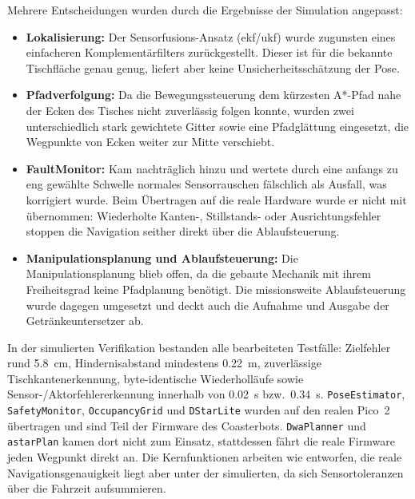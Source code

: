 Mehrere Entscheidungen wurden durch die Ergebnisse der Simulation angepasst:
\begin{itemize}[itemsep=2pt,topsep=3pt,parsep=0pt]
    \item \textbf{Lokalisierung:} Der Sensorfusions-Ansatz (\acrshort{ekf}/\acrshort{ukf}) wurde zugunsten eines einfacheren Komplementärfilters zurückgestellt. Dieser ist für die bekannte Tischfläche genau genug, liefert aber keine Unsicherheitsschätzung der Pose.
    \item \textbf{Pfadverfolgung:} Da die Bewegungssteuerung dem kürzesten A*-Pfad nahe der Ecken des Tisches nicht zuverlässig folgen konnte, wurden zwei unterschiedlich stark gewichtete Gitter sowie eine Pfadglättung eingesetzt, die Wegpunkte von Ecken weiter zur Mitte verschiebt.
    \item \textbf{FaultMonitor:} Kam nachträglich hinzu und wertete durch eine anfangs zu eng gewählte Schwelle normales Sensorrauschen fälschlich als Ausfall, was korrigiert wurde. Beim Übertragen auf die reale Hardware wurde er nicht mit übernommen: Wiederholte Kanten-, Stillstands- oder Ausrichtungsfehler stoppen die Navigation seither direkt über die Ablaufsteuerung.
    \item \textbf{Manipulationsplanung und Ablaufsteuerung:} Die Manipulationsplanung blieb offen, da die gebaute Mechanik mit ihrem Freiheitsgrad keine Pfadplanung benötigt. Die missionsweite Ablaufsteuerung wurde dagegen umgesetzt und deckt auch die Aufnahme und Ausgabe der Getränkeuntersetzer ab.
\end{itemize}

In der simulierten Verifikation bestanden alle bearbeiteten Testfälle: Zielfehler rund \SI{5,8}{\centi\meter}, Hindernisabstand mindestens \SI{0,22}{\meter}, zuverlässige Tischkantenerkennung, byte-identische Wiederholläufe sowie Sensor-/Aktorfehlererkennung innerhalb von \SI{0,02}{\second} bzw.\ \SI{0,34}{\second}. \texttt{PoseEstimator}, \texttt{SafetyMonitor}, \texttt{OccupancyGrid} und \texttt{DStarLite} wurden auf den realen Pico~2 übertragen und sind Teil der Firmware des Coasterbots. \texttt{DwaPlanner} und \texttt{astarPlan} kamen dort nicht zum Einsatz, stattdessen fährt die reale Firmware jeden Wegpunkt direkt an. Die Kernfunktionen arbeiten wie entworfen, die reale Navigationsgenauigkeit liegt aber unter der simulierten, da sich Sensortoleranzen über die Fahrzeit aufsummieren.
